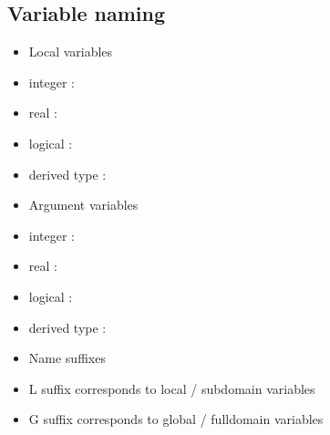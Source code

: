 \documentclass[letterpaper,10pt,english]{sphinxmanual}
\begin{document}
\subsection{Variable naming}
\label{\detokenize{rules/I1:variable-naming}}\begin{itemize}
\item {} 
\sphinxAtStartPar
Local variables

\end{itemize}
\begin{itemize}
\item {} 
\sphinxAtStartPar
integer : 

\item {} 
\sphinxAtStartPar
real : 

\item {} 
\sphinxAtStartPar
logical : 

\item {} 
\sphinxAtStartPar
derived type : 

\end{itemize}
\begin{itemize}
\item {} 
\sphinxAtStartPar
Argument variables

\end{itemize}
\begin{itemize}
\item {} 
\sphinxAtStartPar
integer : 

\item {} 
\sphinxAtStartPar
real : 

\item {} 
\sphinxAtStartPar
logical : 

\item {} 
\sphinxAtStartPar
derived type : 

\end{itemize}
\begin{itemize}
\item {} 
\sphinxAtStartPar
Name suffixes

\end{itemize}
\begin{itemize}
\item {} 
\sphinxAtStartPar
L suffix corresponds to local / subdomain variables

\item {} 
\sphinxAtStartPar
G suffix corresponds to global / full\sphinxhyphen{}domain variables

\end{itemize}
\end{document}
